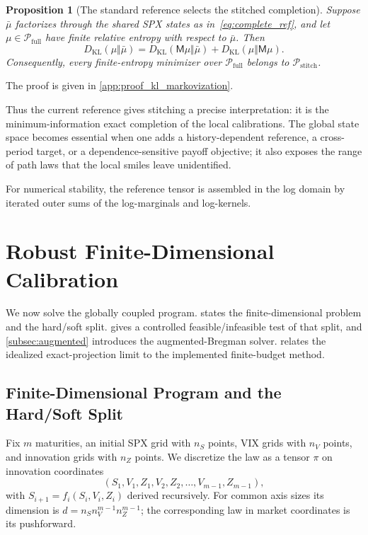 \documentclass{article}
\newtheorem{proposition}{Proposition}[section]
\newcommand{\cP}{\mathcal{P}}
\begin{document}
\begin{proposition}[The standard reference selects the stitched completion]
\label{prop:kl_markovization}
Suppose $\bar\mu$ factorizes through the shared SPX states as in~\eqref{eq:complete_ref}, and let $\mu\in\cP_{\mathrm{full}}$ have finite relative entropy with respect to $\bar\mu$.
Then
\begin{equation}\label{eq:kl_markovization}
D_{\mathrm{KL}}(\mu\Vert\bar\mu)
=
D_{\mathrm{KL}}(\mathsf M\mu\Vert\bar\mu)
+D_{\mathrm{KL}}(\mu\Vert\mathsf M\mu).
\end{equation}
Consequently, every finite-entropy minimizer over $\cP_{\mathrm{full}}$ belongs to $\cP_{\mathrm{stitch}}$.
\end{proposition}
The proof is given in \cref{app:proof_kl_markovization}.

Thus the current reference gives stitching a precise interpretation: it is the minimum-information exact completion of the local calibrations.
The global state space becomes essential when one adds a history-dependent reference, a cross-period target, or a dependence-sensitive payoff objective; it also exposes the range of path laws that the local smiles leave unidentified.

For numerical stability, the reference tensor is assembled in the log domain by iterated outer sums of the log-marginals and log-kernels.

\section{Robust Finite-Dimensional Calibration}\label{sec:algorithms}

We now solve the globally coupled program.
 states the finite-dimensional problem and the hard/soft split.
 gives a controlled feasible/infeasible test of that split, and \cref{subsec:augmented} introduces the augmented-Bregman solver.
 relates the idealized exact-projection limit to the implemented finite-budget method.

\subsection{Finite-Dimensional Program and the Hard/Soft Split}\label{subsec:discrete_formulation}

Fix $m$ maturities, an initial SPX grid with $n_S$ points, VIX grids with $n_V$ points, and innovation grids with $n_Z$ points.
We discretize the law as a tensor $\pi$ on innovation coordinates
\[
(S_1,V_1,Z_1,V_2,Z_2,\ldots,V_{m-1},Z_{m-1}),
\]
with
$S_{i+1}=f_i(S_i,V_i,Z_i)$ derived recursively.
For common axis sizes its dimension is
$d=n_S n_V^{m-1}n_Z^{m-1}$; the corresponding law in market coordinates is its pushforward.
\end{document}
